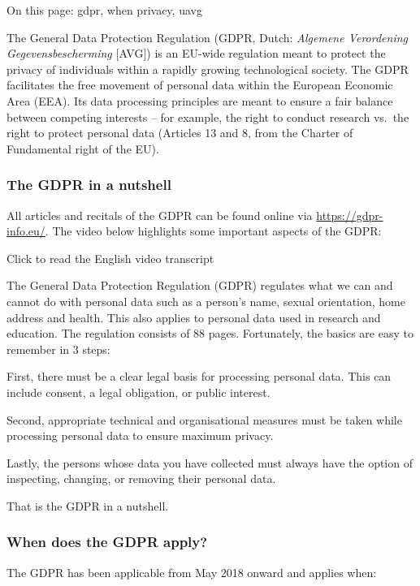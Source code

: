\documentclass[
]{book}
\begin{document}
On this page: gdpr, when privacy, uavg

The General Data Protection Regulation (GDPR, Dutch: \emph{Algemene Verordening
Gegevensbescherming} {[}AVG{]}) is an EU-wide regulation meant to protect the privacy
of individuals within a rapidly growing technological society. The GDPR facilitates
the free movement of personal data within the European Economic Area (EEA). Its
data processing principles are meant to ensure a fair balance between competing
interests -- for example, the right to conduct research vs.~the right to protect
personal data (Articles 13 and 8, from the Charter of Fundamental right of the EU).

\hypertarget{the-gdpr-in-a-nutshell}{%
\subsubsection{The GDPR in a nutshell}\label{the-gdpr-in-a-nutshell}}

All articles and recitals of the GDPR can be found online via \url{https://gdpr-info.eu/}.
The video below highlights some important aspects of the GDPR:

Click to read the English video transcript

The General Data Protection Regulation (GDPR) regulates what we can
and cannot do with personal data such as a person's name, sexual orientation,
home address and health. This also applies to personal data used in research
and education. The regulation consists of 88 pages. Fortunately, the basics
are easy to remember in 3 steps:

First, there must be a clear legal basis for processing personal data. This can
include consent, a legal obligation, or public interest.

Second, appropriate technical and organisational measures must be taken
while processing personal data to ensure maximum privacy.

Lastly, the persons whose data you have collected must always have the
option of inspecting, changing, or removing their personal data.

That is the GDPR in a nutshell.

\hypertarget{gdpr-scope}{%
\subsubsection{When does the GDPR apply?}\label{gdpr-scope}}

The GDPR has been applicable from May 2018 onward and applies when:
\end{document}
